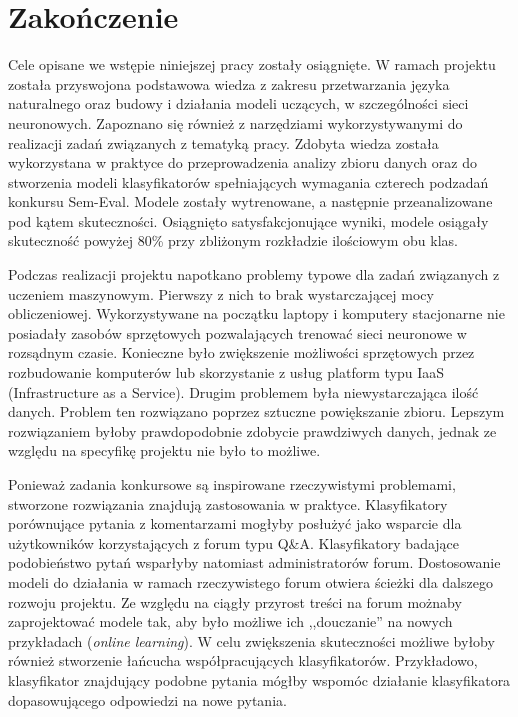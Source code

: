
\chapter{Zakończenie}
Cele opisane we wstępie niniejszej pracy zostały osiągnięte. W ramach projektu została przyswojona podstawowa wiedza z zakresu przetwarzania języka naturalnego oraz budowy i działania modeli uczących, w szczególności sieci neuronowych. Zapoznano się również z narzędziami wykorzystywanymi do realizacji zadań związanych z tematyką pracy. Zdobyta wiedza została wykorzystana w praktyce do przeprowadzenia analizy zbioru danych oraz do stworzenia modeli klasyfikatorów spełniających wymagania czterech podzadań konkursu Sem-Eval. Modele zostały wytrenowane, a następnie przeanalizowane pod kątem skuteczności. Osiągnięto satysfakcjonujące wyniki, modele osiągały skuteczność powyżej 80\% przy zbliżonym rozkładzie ilościowym obu klas.

Podczas realizacji projektu napotkano problemy typowe dla zadań związanych z uczeniem maszynowym. Pierwszy z nich to brak wystarczającej mocy obliczeniowej. Wykorzystywane na początku laptopy i komputery stacjonarne nie posiadały zasobów sprzętowych pozwalających trenować sieci neuronowe w rozsądnym czasie. Konieczne było zwiększenie możliwości sprzętowych przez rozbudowanie komputerów lub skorzystanie z usług platform typu IaaS (Infrastructure as a Service). Drugim problemem była niewystarczająca ilość danych. Problem ten rozwiązano poprzez sztuczne powiększanie zbioru. Lepszym rozwiązaniem byłoby prawdopodobnie zdobycie prawdziwych danych, jednak ze względu na specyfikę projektu nie było to możliwe.

Ponieważ zadania konkursowe są inspirowane rzeczywistymi problemami, stworzone rozwiązania znajdują zastosowania w praktyce. Klasyfikatory porównujące pytania z komentarzami mogłyby posłużyć jako wsparcie dla użytkowników korzystających z forum typu Q\&A. Klasyfikatory badające podobieństwo pytań wsparłyby natomiast administratorów forum. Dostosowanie modeli do działania w ramach rzeczywistego forum otwiera ścieżki dla dalszego rozwoju projektu. Ze względu na ciągły przyrost treści na forum możnaby zaprojektować modele tak, aby było możliwe ich ,,douczanie'' na nowych przykładach (\emph{online learning}). W celu zwiększenia skuteczności możliwe byłoby również stworzenie łańcucha współpracujących klasyfikatorów. Przykładowo, klasyfikator znajdujący podobne pytania mógłby wspomóc działanie klasyfikatora dopasowującego odpowiedzi na nowe pytania.